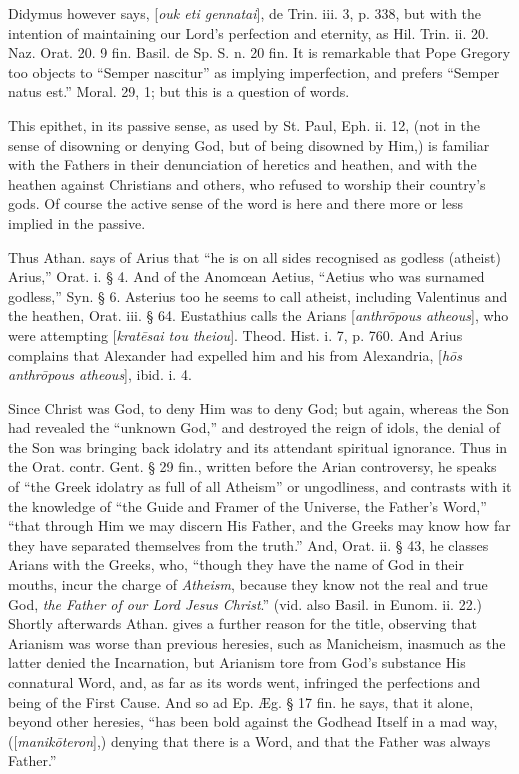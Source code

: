 Didymus however says, [\emph{ouk eti gennatai}],
de Trin. iii. 3, p. 338, but with the intention of maintaining our
Lord's perfection and eternity, as Hil. Trin. ii. 20. Naz. Orat. 20. 9
fin. Basil. de Sp. S. n. 20 fin. It is remarkable that Pope Gregory
too objects to ``Semper nascitur'' as implying imperfection, and prefers
``Semper natus est.'' Moral. 29, 1; but this is a question of words.


This epithet, in its passive sense, as used by
St. Paul, Eph. ii. 12, (not in the sense of disowning or denying God,
but of being disowned by Him,) is familiar with the Fathers in their
denunciation of heretics and heathen, and with the heathen against
Christians and others, who refused to worship their country's gods. Of
course the active sense of the word is here and there more or less
implied in the passive.

Thus Athan. says of Arius that ``he is on all
sides recognised as godless (atheist) Arius,'' Orat. i. § 4. And of
the Anomœan Aetius, ``Aetius who was surnamed godless,'' Syn. § 6.
Asterius too he seems to call atheist, including Valentinus and the
heathen, Orat. iii. § 64. Eustathius calls the Arians [\emph{anthr\={o}pous
atheous}], who were attempting [\emph{krat\={e}sai tou theiou}].
Theod. Hist. i. 7, p. 760. And Arius complains that Alexander had
expelled him and his from Alexandria, [\emph{h\={o}s anthr\={o}pous
atheous}], ibid. i. 4.

Since Christ was God, to deny Him was to deny
God; but again, whereas the Son had revealed the ``unknown God,'' and
destroyed the reign of idols, the denial of the Son was bringing back
idolatry and its attendant spiritual ignorance. Thus in the Orat.
contr. Gent. § 29 fin., written before the Arian controversy, he speaks of ``the Greek idolatry as full of all Atheism'' or
ungodliness, and contrasts with it the knowledge of ``the Guide and
Framer of the Universe, the Father's Word,'' ``that through Him we may
discern His Father, and the Greeks may know how far they have
separated themselves from the truth.'' And, Orat. ii. § 43, he classes
Arians with the Greeks, who, ``though they have the name of God in
their mouths, incur the charge of \emph{Atheism}, because they know
not the real and true God, \emph{the Father of our Lord Jesus Christ}.''
(vid. also Basil. in Eunom. ii. 22.) Shortly afterwards Athan. gives a
further reason for the title, observing that Arianism was worse than
previous heresies, such as Manicheism, inasmuch as the latter denied
the Incarnation, but Arianism tore from God's substance His connatural
Word, and, as far as its words went, infringed the perfections and
being of the First Cause. And so ad Ep. Æg. § 17 fin. he says, that
it alone, beyond other heresies, ``has been bold against the Godhead
Itself in a mad way, ([\emph{manik\={o}teron}],) denying that there
is a Word, and that the Father was always Father.''

